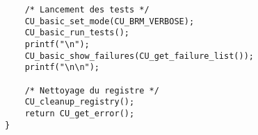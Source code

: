 \begin{lstlisting}
	/* Lancement des tests */
	CU_basic_set_mode(CU_BRM_VERBOSE);
	CU_basic_run_tests();
	printf("\n");
	CU_basic_show_failures(CU_get_failure_list());
	printf("\n\n");

	/* Nettoyage du registre */
	CU_cleanup_registry();
	return CU_get_error();
}
\end{lstlisting}
 
